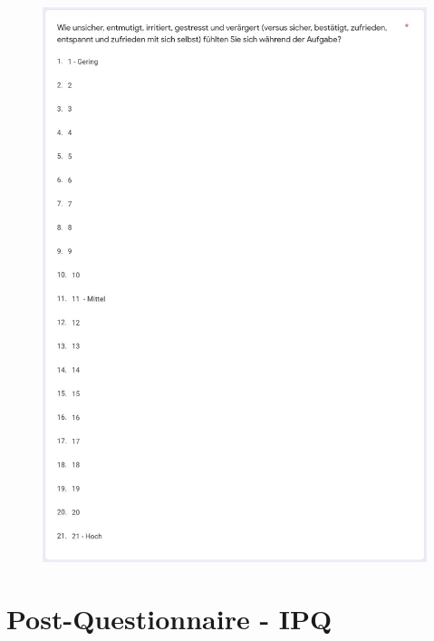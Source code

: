 \documentclass[a4paper,11pt]{article}%
\renewcommand{\\}{\vspace*{0.5\baselineskip} \newline}
\begin{document}
	\begin{figure}[H]
	\centering
		\begin{footnotesize}
			\includegraphics[scale=0.6]{Abbildungen/Fragebogen/Post-Questionnaire/PQTLX6}
		\end{footnotesize}
	\end{figure}	

\newpage
\section{Post-Questionnaire - IPQ}
\label{Post-Questionnaire - IPQ}
\end{document}
